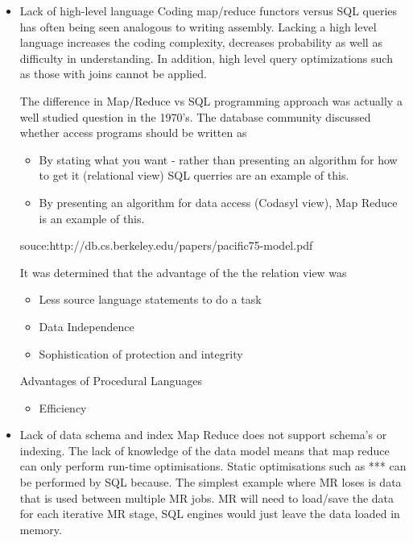 \documentclass[10pt,twocolumn]{IEEEtran11}
\begin{document}
\begin{itemize}
    \item Lack of high-level language 
        Coding map/reduce functors versus SQL queries has often being seen analogous to writing assembly.  Lacking a high level
        language increases the coding complexity, decreases probability as well as difficulty in understanding.  In addition, 
        high level query optimizations such as those with joins cannot be applied.
        \par
        The difference in Map/Reduce vs SQL programming approach was actually a well studied question in the 1970's.
        The database community discussed whether access programs should be written as
        \begin{itemize}
            \item By stating what you want - rather than presenting an algorithm for how to get it (relational view)
                    SQL querries are an example of this.
            \item By presenting an algorithm for data access (Codasyl view), Map Reduce is an example of this.
        \end{itemize}
        
        souce:http://db.cs.berkeley.edu/papers/pacific75-model.pdf
        
        It was determined that the advantage of the the relation view was
        \begin{itemize}
            \item Less source language statements to do a task
            \item Data Independence
            \item Sophistication of protection and integrity
        \end{itemize}
        
        Advantages of Procedural Languages
        \begin{itemize}
            \item Efficiency
        \end{itemize}
        
        
    \item Lack of data schema and index
        Map Reduce does not support schema's or indexing.  The lack of knowledge of the data model means that map reduce can only perform run-time optimisations.  Static optimisations such as *** can be performed by SQL because.  The simplest example where MR loses is data that is used between multiple MR jobs.  MR will need to load/save the data for each iterative MR stage, SQL engines would just leave the data loaded in memory. 
    

\end{itemize}
\end{document}
